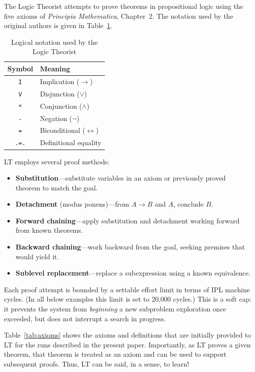 \documentclass[journal]{IEEEtran}
\begin{document}
The Logic Theorist attempts to prove theorems in propositional logic
using the five axioms of \textit{Principia Mathematica}, Chapter~2.
The notation used by the original authors is given in
Table~\ref{tab:notation}.

\begin{table}[h]
\centering
\caption{Logical notation used by the Logic Theorist}
\label{tab:notation}
\begin{tabular}{cl}
\toprule
\textbf{Symbol} & \textbf{Meaning} \\
\midrule
\texttt{I} & Implication ($\rightarrow$) \\
\texttt{V} & Disjunction ($\lor$) \\
\texttt{*} & Conjunction ($\land$) \\
\texttt{-} & Negation ($\lnot$) \\
\texttt{=} & Biconditional ($\leftrightarrow$) \\
\texttt{.=.} & Definitional equality \\
\bottomrule
\end{tabular}
\end{table}

LT employs several proof methods:

\begin{itemize}
\item \textbf{Substitution}---substitute variables in an axiom or
  previously proved theorem to match the goal.
\item \textbf{Detachment} (modus ponens)---from $A \rightarrow B$ and
  $A$, conclude $B$.
\item \textbf{Forward chaining}---apply substitution and detachment
  working forward from known theorems.
\item \textbf{Backward chaining}---work backward from the goal,
  seeking premises that would yield it.
\item \textbf{Sublevel replacement}---replace a subexpression using a
  known equivalence.
\end{itemize}

Each proof attempt is bounded by a settable effort limit in terms of
IPL machine cycles. (In all below examples this limit is set to 20,000
cycles.) This is a soft cap: it prevents the system from
\textit{beginning} a new subproblem exploration once exceeded, but
does not interrupt a search in progress.

Table~\ref{tab:axioms} shows the axioms and definitions that are
initially provided to LT for the runs described in the present
paper. Importantly, as LT proves a given theorem, that theorem is
treated as an axiom and can be used to support subsequent
proofs. Thus, LT can be said, in a sense, to learn!
\end{document}
